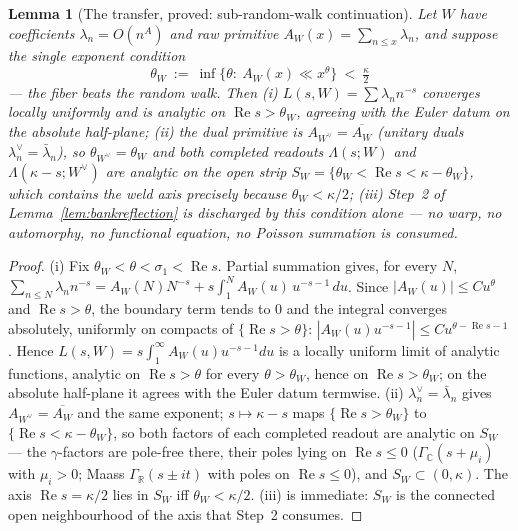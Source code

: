 \documentclass[11pt]{article}
\newtheorem{lemma}[theorem]{Lemma}
\theoremstyle{definition}
\renewcommand{\Re}{\operatorname{Re}}
\begin{document}
\begin{lemma}[The transfer, proved: sub-random-walk continuation]\label{lem:transfer}
Let $W$ have coefficients $\lambda_n=O(n^{A})$ and raw primitive $A_W(x)=\sum_{n\le x}\lambda_n$, and suppose
the single exponent condition
\[
  \theta_W\ :=\ \inf\{\theta:\ A_W(x)\ll x^{\theta}\}\ <\ \tfrac\kappa2
\]
--- \emph{the fiber beats the random walk}. Then \textup{(i)} $L(s,W)=\sum\lambda_n n^{-s}$ converges locally
uniformly and is analytic on $\Re s>\theta_W$, agreeing with the Euler datum on the absolute half-plane;
\textup{(ii)} the dual primitive is $A_{W^\vee}=\overline{A_W}$ (unitary duals $\lambda^\vee_n=
\bar\lambda_n$), so $\theta_{W^\vee}=\theta_W$ and \emph{both} completed readouts $\Lambda(s;W)$ and
$\Lambda(\kappa-s;W^\vee)$ are analytic on the open strip
$S_W=\{\theta_W<\Re s<\kappa-\theta_W\}$, which contains the weld axis precisely because
$\theta_W<\kappa/2$; \textup{(iii)} Step~2 of Lemma~\ref{lem:bankreflection} is discharged by this condition
alone --- no warp, no automorphy, no functional equation, no Poisson summation is consumed.
\end{lemma}
\begin{proof}
\textup{(i)} Fix $\theta_W<\theta<\sigma_1<\Re s$. Partial summation gives, for every $N$,
$\sum_{n\le N}\lambda_n n^{-s}=A_W(N)N^{-s}+s\int_1^{N}A_W(u)\,u^{-s-1}\,du$. Since $|A_W(u)|\le C u^{\theta}$
and $\Re s>\theta$, the boundary term tends to $0$ and the integral converges absolutely, uniformly on
compacts of $\{\Re s>\theta\}$: $|A_W(u)u^{-s-1}|\le C u^{\theta-\Re s-1}$. Hence
$L(s,W)=s\int_1^\infty A_W(u)u^{-s-1}du$ is a locally uniform limit of analytic functions, analytic on
$\Re s>\theta$ for every $\theta>\theta_W$, hence on $\Re s>\theta_W$; on the absolute half-plane it agrees
with the Euler datum termwise. \textup{(ii)} $\lambda^\vee_n=\bar\lambda_n$ gives $A_{W^\vee}=\overline{A_W}$
and the same exponent; $s\mapsto\kappa-s$ maps $\{\Re s>\theta_W\}$ to $\{\Re s<\kappa-\theta_W\}$, so both
factors of each completed readout are analytic on $S_W$ --- the $\gamma$-factors are pole-free there, their
poles lying on $\Re s\le0$ ($\Gamma_{\mathbb C}(s+\mu_i)$ with $\mu_i>0$; Maass $\Gamma_{\mathbb R}(s\pm it)$
with poles on $\Re s\le 0$), and $S_W\subset(0,\kappa)$. The axis $\Re s=\kappa/2$ lies in $S_W$ iff
$\theta_W<\kappa/2$. \textup{(iii)} is immediate: $S_W$ is the connected open neighbourhood of the axis that
Step~2 consumes.
\end{proof}
\end{document}
